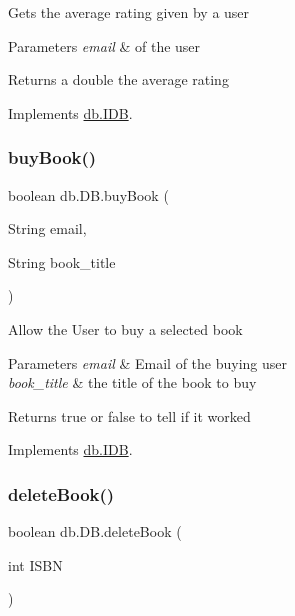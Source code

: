 Gets the average rating given by a user 
\begin{DoxyParams}{Parameters}
{\em email} & of the user \\
\hline
\end{DoxyParams}
\begin{DoxyReturn}{Returns}
a double the average rating 
\end{DoxyReturn}


Implements \hyperlink{interfacedb_1_1_i_d_b_a5bb2209c976ab0a7f20606ed5df0e0cf}{db.\+I\+DB}.

\mbox{\label{classdb_1_1_d_b_a8a1a15bae4352c3c73092d801ef26c41}} 
\subsubsection{\texorpdfstring{buy\+Book()}{buyBook()}}
{\footnotesize\ttfamily boolean db.\+D\+B.\+buy\+Book (\begin{DoxyParamCaption}\item[{String}]{email,  }\item[{String}]{book\+\_\+title }\end{DoxyParamCaption})}

Allow the User to buy a selected book 
\begin{DoxyParams}{Parameters}
{\em email} & Email of the buying user \\
\hline
{\em book\+\_\+title} & the title of the book to buy \\
\hline
\end{DoxyParams}
\begin{DoxyReturn}{Returns}
true or false to tell if it worked 
\end{DoxyReturn}


Implements \hyperlink{interfacedb_1_1_i_d_b_a2ac985a90e8369fab676950b3fb4c2bc}{db.\+I\+DB}.

\mbox{\label{classdb_1_1_d_b_a712d418878efa15112c62eb6db4b022d}} 
\subsubsection{\texorpdfstring{delete\+Book()}{deleteBook()}}
{\footnotesize\ttfamily boolean db.\+D\+B.\+delete\+Book (\begin{DoxyParamCaption}\item[{int}]{I\+S\+BN }\end{DoxyParamCaption})}

